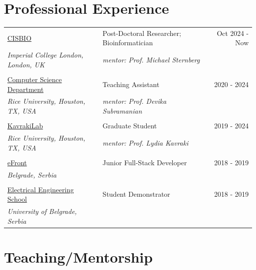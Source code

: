 \documentclass[a4paper,12pt]{article}
\begin{document}
\section{Professional Experience}
\begin{tabularx}{\linewidth}{>{\hsize=0.7\hsize}X X r}

\small{\href{https://www.imperial.ac.uk/integrative-systems-biology/about/}{CISBIO}}
& Post-Doctoral Researcher; \small{Bioinformatician}
& Oct 2024 - Now
\\
\scriptsize{\textit{Imperial College London, London, UK}}  
& 
\scriptsize{\textit{mentor: Prof. Michael Sternberg}} 
& 
\\
 & & \\

\small{\href{https://csweb.rice.edu/}{Computer Science Department}}
& Teaching Assistant 
& 2020 - 2024
\\
\scriptsize{\textit{Rice University, Houston, TX, USA}}  
&
\scriptsize{\textit{mentor: Prof. Devika Subramanian}} 
& 
\\
 & & \\

\small{\href{https://www.kavrakilab.org/}{KavrakiLab}}
& Graduate Student 
& 2019 - 2024
\\
\scriptsize{\textit{Rice University, Houston, TX, USA}}  
&
\scriptsize{\textit{mentor: Prof. Lydia Kavraki}} 
& 
\\
 & & \\

\small{\href{https://www.efront.com/}{eFront}}
& Junior Full-Stack Developer 
& 2018 - 2019
\\
\scriptsize{\textit{Belgrade, Serbia}}  
&
& 
\\
 & & \\

\small{\href{https://www.etf.bg.ac.rs/en}{Electrical Engineering School}}
& Student Demonstrator
& 2018 - 2019
\\
\scriptsize{\textit{University of Belgrade, Serbia}}  
&
& 
\\


\end{tabularx}




\section{Teaching/Mentorship}
\end{document}
